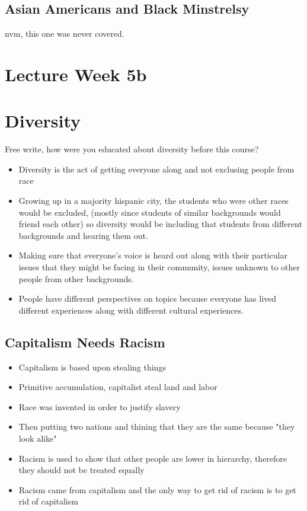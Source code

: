 \documentclass{article}
\begin{document}
\subsection{Asian Americans and Black Minstrelsy}
nvm, this one was never covered.


\section*{Lecture Week 5b}

\section{Diversity}
Free write, how were you educated about diversity before this course?
\begin{itemize}
  \item Diversity is the act of getting everyone along and not exclusing people from race
  \item Growing up in a majority hispanic city, the students who were other races would be excluded,
    (mostly since students of similar backgrounds would friend each other)
    so diversity would be including that students from different backgrounds and hearing them out.
  \item Making sure that everyone's voice is heard out along with their 
    particular issues that they might be facing in their community,
    issues unknown to other people from other backgrounds.
  \item People have different perspectives on topics because everyone has lived
    different experiences along with different cultural experiences.

\end{itemize}

\subsection{Capitalism Needs Racism}
\begin{itemize}
  \item Capitalism is based upon stealing things
  \item Primitive accumulation, capitalist steal land and labor
  \item Race was invented in order to justify slavery
  \item Then putting two nations and thining that they are the same
    because "they look alike"
  \item Racism is used to show that other people are lower in hierarchy, therefore
    they should not be treated equally 
  \item Racism came from capitalism and the only way to get rid of racism
    is to get rid of capitalism
\end{itemize}
\end{document}
